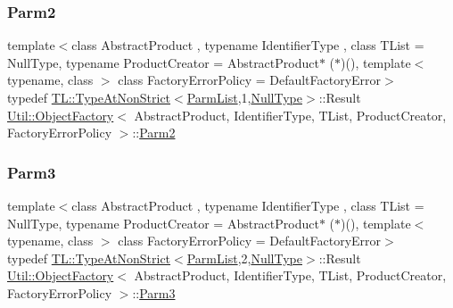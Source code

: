 \subsubsection{\texorpdfstring{Parm2}{Parm2}\hspace{0.1cm}{\footnotesize\ttfamily [3/3]}}
{\footnotesize\ttfamily template$<$class Abstract\+Product , typename Identifier\+Type , class T\+List  = Null\+Type, typename Product\+Creator  = Abstract\+Product$\ast$ ($\ast$)(), template$<$ typename, class $>$ class Factory\+Error\+Policy = Default\+Factory\+Error$>$ \\
typedef \mbox{\hyperlink{structUtil_1_1TL_1_1TypeAtNonStrict}{T\+L\+::\+Type\+At\+Non\+Strict}}$<$\mbox{\hyperlink{classUtil_1_1ObjectFactory_a46f003a5928e8a60140e0a74ac261c36}{Parm\+List}},1,\mbox{\hyperlink{classUtil_1_1NullType}{Null\+Type}}$>$\+::Result \mbox{\hyperlink{classUtil_1_1ObjectFactory}{Util\+::\+Object\+Factory}}$<$ Abstract\+Product, Identifier\+Type, T\+List, Product\+Creator, Factory\+Error\+Policy $>$\+::\mbox{\hyperlink{classUtil_1_1ObjectFactory_ae438d0c17d1510e6fd7db9ac479a371f}{Parm2}}}

\mbox{\label{classUtil_1_1ObjectFactory_ae5c679dd2f210e0a5ad257b336f754fb}} 
\subsubsection{\texorpdfstring{Parm3}{Parm3}\hspace{0.1cm}{\footnotesize\ttfamily [1/3]}}
{\footnotesize\ttfamily template$<$class Abstract\+Product , typename Identifier\+Type , class T\+List  = Null\+Type, typename Product\+Creator  = Abstract\+Product$\ast$ ($\ast$)(), template$<$ typename, class $>$ class Factory\+Error\+Policy = Default\+Factory\+Error$>$ \\
typedef \mbox{\hyperlink{structUtil_1_1TL_1_1TypeAtNonStrict}{T\+L\+::\+Type\+At\+Non\+Strict}}$<$\mbox{\hyperlink{classUtil_1_1ObjectFactory_a46f003a5928e8a60140e0a74ac261c36}{Parm\+List}},2,\mbox{\hyperlink{classUtil_1_1NullType}{Null\+Type}}$>$\+::Result \mbox{\hyperlink{classUtil_1_1ObjectFactory}{Util\+::\+Object\+Factory}}$<$ Abstract\+Product, Identifier\+Type, T\+List, Product\+Creator, Factory\+Error\+Policy $>$\+::\mbox{\hyperlink{classUtil_1_1ObjectFactory_ae5c679dd2f210e0a5ad257b336f754fb}{Parm3}}}

